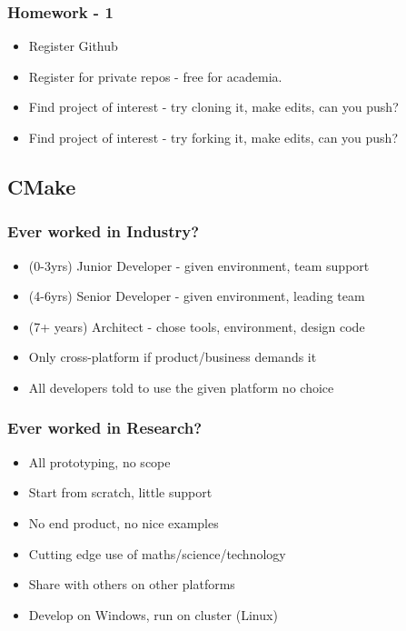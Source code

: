 \subsubsection{Homework - 1}\label{homework---1}

\begin{itemize}
\itemsep1pt\parskip0pt
\item
  Register Github
\item
  Register for private repos - free for academia.
\item
  Find project of interest - try cloning it, make edits, can you push?
\item
  Find project of interest - try forking it, make edits, can you push?
\end{itemize}

\subsection{CMake}\label{cmake}

\subsubsection{Ever worked in Industry?}\label{ever-worked-in-industry}

\begin{itemize}
\itemsep1pt\parskip0pt
\item
  (0-3yrs) Junior Developer - given environment, team support
\item
  (4-6yrs) Senior Developer - given environment, leading team
\item
  (7+ years) Architect - chose tools, environment, design code
\item
  Only cross-platform if product/business demands it
\item
  All developers told to use the given platform no choice
\end{itemize}

\subsubsection{Ever worked in Research?}\label{ever-worked-in-research}

\begin{itemize}
\itemsep1pt\parskip0pt
\item
  All prototyping, no scope
\item
  Start from scratch, little support
\item
  No end product, no nice examples
\item
  Cutting edge use of maths/science/technology
\item
  Share with others on other platforms
\item
  Develop on Windows, run on cluster (Linux)
\end{itemize}

